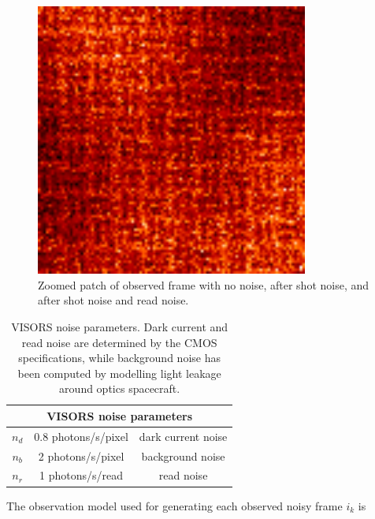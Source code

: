 \documentclass[tocnosub,noragright,centerchapter,12pt]{uiucecethesis09}
\begin{document}
\begin{figure}
\begin{minipage}{.3\textwidth}
    \includegraphics[width=0.8\textwidth]{figures/aia_modulate_zoom_blur_blur_pn.png}
  \end{minipage}
  \caption{Zoomed patch of observed frame with no noise, after shot noise, and after shot noise and read noise.}
  \label{fig:aia_blur_blur_pn}
\end{figure}

\begin{table}
  \begin{center}
    \begin{tabular}{|c|c|c|}
      \hline
      \multicolumn{3}{|c|}{VISORS noise parameters} \\
      \hline
      $n_d$ & 0.8 photons/s/pixel  & dark current noise \\
      $n_b$ & 2 photons/s/pixel & background noise \\
      $n_r$ & 1 photons/s/read  & read noise \\
      \hline
    \end{tabular}
    \caption{VISORS noise parameters.  Dark current and read noise are determined by the CMOS specifications, while background noise has been computed by modelling light leakage around optics spacecraft.}
    \label{tab:daw}
  \end{center}
\end{table}

The observation model used for generating each observed noisy frame $i_k$ is
\end{document}
